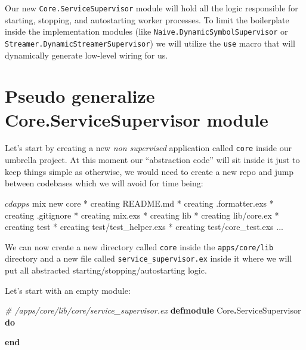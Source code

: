 \documentclass[
  oneside]{book}
\newenvironment{Shaded}{\begin{snugshade}}{\end{snugshade}}
\newcommand{\CommentTok}[1]{\textcolor[rgb]{0.56,0.35,0.01}{\textit{#1}}}
\newcommand{\ConstantTok}[1]{\textcolor[rgb]{0.00,0.00,0.00}{#1}}
\newcommand{\ExtensionTok}[1]{#1}
\newcommand{\KeywordTok}[1]{\textcolor[rgb]{0.13,0.29,0.53}{\textbf{#1}}}
\newcommand{\NormalTok}[1]{#1}
\newcommand{\OperatorTok}[1]{\textcolor[rgb]{0.81,0.36,0.00}{\textbf{#1}}}
\begin{document}
Our new \texttt{Core.ServiceSupervisor} module will hold all the logic responsible for starting, stopping, and autostarting worker processes. To limit the boilerplate inside the implementation modules (like \texttt{Naive.DynamicSymbolSupervisor} or \texttt{Streamer.DynamicStreamerSupervisor}) we will utilize the \texttt{use} macro that will dynamically generate low-level wiring for us.

\hypertarget{pseudo-generalize-core.servicesupervisor-module}{%
\section{Pseudo generalize Core.ServiceSupervisor module}\label{pseudo-generalize-core.servicesupervisor-module}}

Let's start by creating a new \emph{non supervised} application called \texttt{core} inside our umbrella project. At this moment our ``abstraction code'' will sit inside it just to keep things simple as otherwise, we would need to create a new repo and jump between codebases which we will avoid for time being:

\begin{Shaded}
\begin{Highlighting}[]
\ExtensionTok{$}\NormalTok{ cd apps}
\ExtensionTok{$}\NormalTok{ mix new core}
\ExtensionTok{*}\NormalTok{ creating README.md}
\ExtensionTok{*}\NormalTok{ creating .formatter.exs}
\ExtensionTok{*}\NormalTok{ creating .gitignore}
\ExtensionTok{*}\NormalTok{ creating mix.exs}
\ExtensionTok{*}\NormalTok{ creating lib}
\ExtensionTok{*}\NormalTok{ creating lib/core.ex}
\ExtensionTok{*}\NormalTok{ creating test}
\ExtensionTok{*}\NormalTok{ creating test/test\_helper.exs}
\ExtensionTok{*}\NormalTok{ creating test/core\_test.exs}
\ExtensionTok{...}
\end{Highlighting}
\end{Shaded}

We can now create a new directory called \texttt{core} inside the \texttt{apps/core/lib} directory and a new file called \texttt{service\_supervisor.ex} inside it where we will put all abstracted starting/stopping/autostarting logic.

Let's start with an empty module:

\begin{Shaded}
\begin{Highlighting}[]
\CommentTok{\# /apps/core/lib/core/service\_supervisor.ex}
\KeywordTok{defmodule} \ConstantTok{Core}\OperatorTok{.}\ConstantTok{ServiceSupervisor} \KeywordTok{do}

\KeywordTok{end}
\end{Highlighting}
\end{Shaded}
\end{document}
